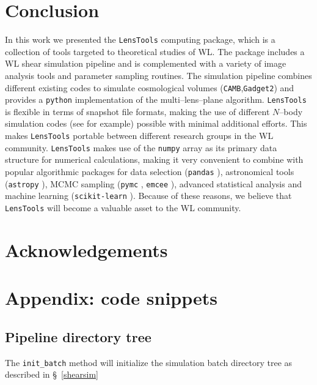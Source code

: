 \documentclass[reprint,aps,prd,superscriptaddress,showkeys,showpacs]{revtex4-1}
\newcommand{\ttt}[1]{\texttt{#1}}
\newcommand{\LT}{\texttt{LensTools} }
\begin{document}
\section{Conclusion}
%
In this work we presented the \LT computing package, which is a collection of tools targeted to theoretical studies of WL. The package includes a WL shear simulation pipeline and is complemented with a variety of image analysis tools and parameter sampling routines. The simulation pipeline combines different existing codes to simulate cosmological volumes (\ttt{CAMB},\ttt{Gadget2}) and provides a \ttt{python} implementation of the multi--lens--plane algorithm. \LT is flexible in terms of snapshot file formats, making the use of different $N$--body simulation codes (see \citep{HACC} for example) possible with minimal additional efforts. This makes \LT portable between different research groups in the WL community. \LT makes use of the \ttt{numpy} array as its primary data structure for numerical calculations, making it very convenient to combine with popular algorithmic packages for data selection (\ttt{pandas} \citep{pandas}), astronomical tools (\ttt{astropy} \citep{astropy}), MCMC sampling (\ttt{pymc} \citep{pymc}, \ttt{emcee} \citep{pymc}), advanced statistical analysis and machine learning (\ttt{scikit-learn} \citep{scikit-learn}). Because of these reasons, we believe that \LT will become a valuable asset to the WL community.    


 

\section*{Acknowledgements}




\section*{Appendix: code snippets}

\subsection{Pipeline directory tree}

The \ttt{init\_batch} method will initialize the simulation batch directory tree as described in \S~\ref{shearsim}
\begin{widetext}
\inputminted[linenos]{python}{Snippets/dirtree.py}
\end{widetext}
\end{document}
